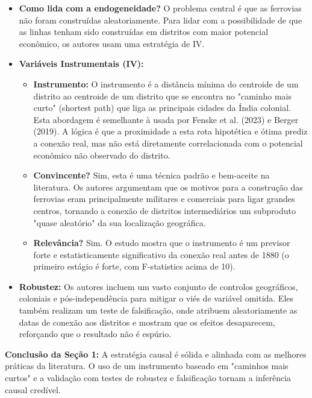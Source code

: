 \documentclass[12pt, a4paper]{article}
\begin{document}
\begin{itemize}
    \item \textbf{Como lida com a endogeneidade?} O problema central é que as ferrovias não foram construídas aleatoriamente. Para lidar com a possibilidade de que as linhas tenham sido construídas em distritos com maior potencial econômico, os autores usam uma estratégia de IV.

    \item \textbf{Variáveis Instrumentais (IV):}
    \begin{itemize}
        \item \textbf{Instrumento:} O instrumento é a distância mínima do centroide de um distrito ao centroide de um distrito que se encontra no "caminho mais curto" (shortest path) que liga as principais cidades da Índia colonial. Esta abordagem é semelhante à usada por Fenske et al. (2023) e Berger (2019). A lógica é que a proximidade a esta rota hipotética e ótima prediz a conexão real, mas não está diretamente correlacionada com o potencial econômico não observado do distrito.
        \item \textbf{Convincente?} Sim, esta é uma técnica padrão e bem-aceite na literatura. Os autores argumentam que os motivos para a construção das ferrovias eram principalmente militares e comerciais para ligar grandes centros, tornando a conexão de distritos intermediários um subproduto "quase aleatório" da sua localização geográfica.
        \item \textbf{Relevância?} Sim. O estudo mostra que o instrumento é um previsor forte e estatisticamente significativo da conexão real antes de 1880 (o primeiro estágio é forte, com F-statistics acima de 10).
    \end{itemize}

    \item \textbf{Robustez:} Os autores incluem um vasto conjunto de controlos geográficos, coloniais e pós-independência para mitigar o viés de variável omitida. Eles também realizam um teste de falsificação, onde atribuem aleatoriamente as datas de conexão aos distritos e mostram que os efeitos desaparecem, reforçando que o resultado não é espúrio.
\end{itemize}

\noindent\textbf{Conclusão da Seção 1:} A estratégia causal é sólida e alinhada com as melhores práticas da literatura. O uso de um instrumento baseado em "caminhos mais curtos" e a validação com testes de robustez e falsificação tornam a inferência causal credível.
\end{document}

